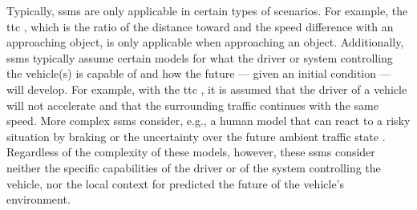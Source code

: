 Typically, \acp{ssm} are only applicable in certain types of scenarios.
For example, the \ac{ttc} \autocite{hayward1972near}, which is the ratio of the distance toward and the speed difference with an approaching object, is only applicable when approaching an object.
Additionally, \acp{ssm} typically assume certain models for what the driver or system controlling the vehicle(s) is capable of and how the future --- given an initial condition --- will develop. 
For example, with the \ac{ttc} \autocite{hayward1972near}, it is assumed that the driver of a vehicle will not accelerate and that the surrounding traffic continues with the same speed. 
More complex \acp{ssm} consider, e.g., a human model that can react to a risky situation by braking \autocite{wang2014evaluation} or the uncertainty over the future ambient traffic state \autocite{mullakkal2020probabilistic}.
Regardless of the complexity of these models, however, these \acp{ssm} consider neither the specific capabilities of the driver or of the system controlling the vehicle, nor the local context for predicted the future of the vehicle's environment.  


